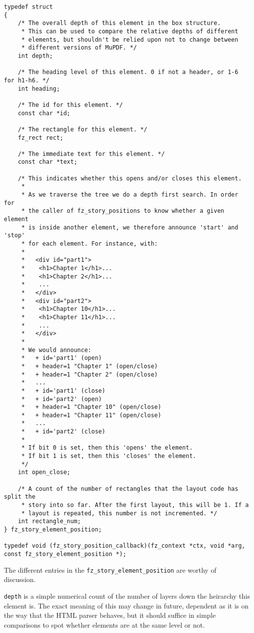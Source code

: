 \documentclass[oneside]{book}
\begin{document}
\begin{lstlisting}
typedef struct
{
	/* The overall depth of this element in the box structure.
	 * This can be used to compare the relative depths of different
	 * elements, but shouldn't be relied upon not to change between
	 * different versions of MuPDF. */
	int depth;

	/* The heading level of this element. 0 if not a header, or 1-6 for h1-h6. */
	int heading;

	/* The id for this element. */
	const char *id;

	/* The rectangle for this element. */
	fz_rect rect;

	/* The immediate text for this element. */
	const char *text;

	/* This indicates whether this opens and/or closes this element.
	 *
	 * As we traverse the tree we do a depth first search. In order for
	 * the caller of fz_story_positions to know whether a given element
	 * is inside another element, we therefore announce 'start' and 'stop'
	 * for each element. For instance, with:
	 *
	 *   <div id="part1">
	 *    <h1>Chapter 1</h1>...
	 *    <h1>Chapter 2</h1>...
	 *    ...
	 *   </div>
	 *   <div id="part2">
	 *    <h1>Chapter 10</h1>...
	 *    <h1>Chapter 11</h1>...
	 *    ...
	 *   </div>
	 *
	 * We would announce:
	 *   + id='part1' (open)
	 *   + header=1 "Chapter 1" (open/close)
	 *   + header=1 "Chapter 2" (open/close)
	 *   ...
	 *   + id='part1' (close)
	 *   + id='part2' (open)
	 *   + header=1 "Chapter 10" (open/close)
	 *   + header=1 "Chapter 11" (open/close)
	 *   ...
	 *   + id='part2' (close)
	 *
	 * If bit 0 is set, then this 'opens' the element.
	 * If bit 1 is set, then this 'closes' the element.
	 */
	int open_close;

	/* A count of the number of rectangles that the layout code has split the
	 * story into so far. After the first layout, this will be 1. If a
	 * layout is repeated, this number is not incremented. */
	int rectangle_num;
} fz_story_element_position;

typedef void (fz_story_position_callback)(fz_context *ctx, void *arg, const fz_story_element_position *);
\end{lstlisting}

The different entries in the \texttt{fz\_story\_element\_position} are worthy of discussion.

\texttt{depth} is a simple numerical count of the number of layers down the heirarchy this element is. The exact meaning of this may change in future, dependent as it is on the way that the HTML parser behaves, but it should suffice in simple comparisons to spot whether elements are at the same level or not.
\end{document}
